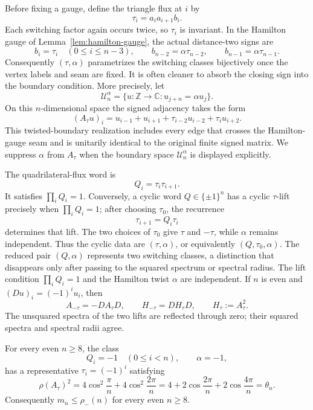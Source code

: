 Before fixing a gauge, define the triangle flux at \(i\) by
\[
\tau_i=a_i a_{i+1}b_i.
\]
Each switching factor again occurs twice, so \(\tau_i\) is invariant.
In the Hamilton gauge of Lemma~\ref{lem:hamilton-gauge}, the actual
distance-two signs are
\[
b_i=\tau_i\quad(0\leq i\leq n-3),\qquad
b_{n-2}=\alpha\tau_{n-2},\qquad
b_{n-1}=\alpha\tau_{n-1}.
\]
Consequently \((\tau,\alpha)\) parametrizes the switching classes
bijectively once the vertex labels and seam are fixed.  It is often cleaner
to absorb the closing sign into the boundary condition.  More precisely, let
\[
\mathcal U_n^\alpha
=\{u:\mathbb Z\to\mathbb C:u_{j+n}=\alpha u_j\}.
\]
On this \(n\)-dimensional space the signed adjacency takes the form
\begin{equation}\label{eq:A-tau}
(A_\tau u)_i
=u_{i-1}+u_{i+1}+\tau_{i-2}u_{i-2}+\tau_i u_{i+2}.
\end{equation}
This twisted-boundary realization includes every edge that crosses the
Hamilton-gauge seam and is unitarily identical to the original finite
signed matrix.  We suppress \(\alpha\) from \(A_\tau\) when the boundary
space \(\mathcal U_n^\alpha\) is displayed explicitly.

The quadrilateral-flux word is
\[
Q_i=\tau_i\tau_{i+1}.
\]
It satisfies \(\prod_iQ_i=1\).  Conversely, a cyclic word
\(Q\in\{\pm1\}^n\) has a cyclic \(\tau\)-lift precisely when
\(\prod_iQ_i=1\); after choosing \(\tau_0\), the recurrence
\[
\tau_{i+1}=Q_i\tau_i
\]
determines that lift.  The two choices of \(\tau_0\) give \(\tau\) and
\(-\tau\), while \(\alpha\) remains independent. Thus the cyclic
data are \((\tau,\alpha)\), or equivalently
\((Q,\tau_0,\alpha)\).  The reduced pair \((Q,\alpha)\) represents two
switching classes, a distinction that disappears only after passing to the
squared spectrum or spectral radius.  The lift condition
\(\prod_iQ_i=1\) and the Hamilton twist \(\alpha\) are independent.  If
\(n\) is even and
\((Du)_i=(-1)^iu_i\), then
\begin{equation}\label{eq:lift-negation}
A_{-\tau}=-DA_\tau D,
\qquad
H_{-\tau}=DH_\tau D,
\qquad H_\tau:=A_\tau^2.
\end{equation}
The unsquared spectra of the two lifts are reflected through zero; their
squared spectra and spectral radii agree.

\begin{proposition}
\label{prop:candidate-attainment}
For every even \(n\geq8\), the class
\[
Q_i=-1\quad(0\leq i<n),\qquad \alpha=-1,
\]
has a representative \(\tau_i=(-1)^i\) satisfying
\[
\rho(A_\tau)^2
=4\cos^2\frac{\pi}{n}+4\cos^2\frac{2\pi}{n}
=4+2\cos\frac{2\pi}{n}+2\cos\frac{4\pi}{n}
=\theta_n.
\]
Consequently \(m_n\leq\rho_-(n)\) for every even \(n\geq8\).
\end{proposition}

